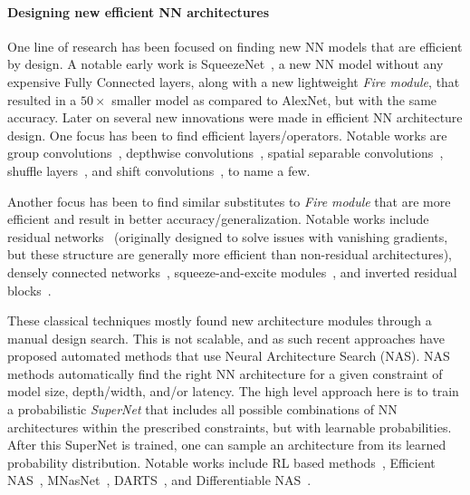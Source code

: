 \paragraph*{Designing new efficient NN architectures}
One line of research has been focused on finding new NN models
that are efficient by design. A notable early work is SqueezeNet~\cite{iandola2016squeezenet},
a new NN model without any expensive Fully Connected layers,
along with a new lightweight \emph{Fire module}, that resulted
in a $50\times$ smaller model as compared to AlexNet, but with the
same accuracy. Later on several new innovations were made in
efficient NN architecture design.
One focus has been to find efficient layers/operators.
Notable works are
group convolutions~\cite{ioannou2017deep}, 
depthwise convolutions~\cite{howard2017mobilenets},
spatial separable convolutions~\cite{mamalet2012simplifying},
shuffle layers~\cite{ma2018shufflenet},
and shift convolutions~\cite{wu2018shift}, to name a few.

Another focus has been to find similar substitutes to \emph{Fire module} that are more efficient and result in better
accuracy/generalization. Notable works include
residual networks~\cite{he2016deep} (originally designed
to solve issues with vanishing gradients, but these structure are generally more efficient
than non-residual architectures), densely connected networks~\cite{huang2017densely},
squeeze-and-excite modules~\cite{hu2018squeeze},
and inverted residual blocks~\cite{sandler2018mobilenetv2}.

These classical techniques mostly found new architecture modules
through a manual design search. This is not scalable, and as such
recent approaches have proposed automated methods that use
 Neural Architecture Search (NAS). NAS methods
automatically find the right NN architecture for a given constraint
of model size, depth/width, and/or latency.
The high level approach here is to train a probabilistic \emph{SuperNet}
that includes all possible combinations of NN architectures within the prescribed
constraints, but with learnable probabilities. After this SuperNet is trained,
one can sample an architecture from its learned probability distribution.
Notable works include 
RL based methods~\cite{zoph2016neural},
Efficient NAS~\cite{pham2018efficient},
MNasNet~\cite{tan2019mnasnet},
DARTS~\cite{liu2018darts},
and Differentiable NAS~\cite{wu2019fbnet}.


